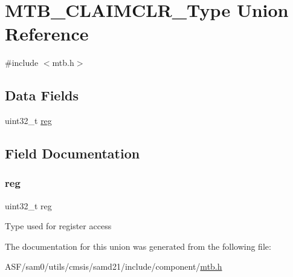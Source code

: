 \hypertarget{union_m_t_b___c_l_a_i_m_c_l_r___type}{}\section{M\+T\+B\+\_\+\+C\+L\+A\+I\+M\+C\+L\+R\+\_\+\+Type Union Reference}
\label{union_m_t_b___c_l_a_i_m_c_l_r___type}


{\ttfamily \#include $<$mtb.\+h$>$}

\subsection*{Data Fields}
\begin{DoxyCompactItemize}
\item 
uint32\+\_\+t \mbox{\hyperlink{union_m_t_b___c_l_a_i_m_c_l_r___type_a6b91636401516a477989a336376d7b40}{reg}}
\end{DoxyCompactItemize}


\subsection{Field Documentation}
\mbox{\label{union_m_t_b___c_l_a_i_m_c_l_r___type_a6b91636401516a477989a336376d7b40}} 
\subsubsection{\texorpdfstring{reg}{reg}}
{\footnotesize\ttfamily uint32\+\_\+t reg}

Type used for register access 

The documentation for this union was generated from the following file\+:\begin{DoxyCompactItemize}
\item 
A\+S\+F/sam0/utils/cmsis/samd21/include/component/\mbox{\hyperlink{component_2mtb_8h}{mtb.\+h}}\end{DoxyCompactItemize}
